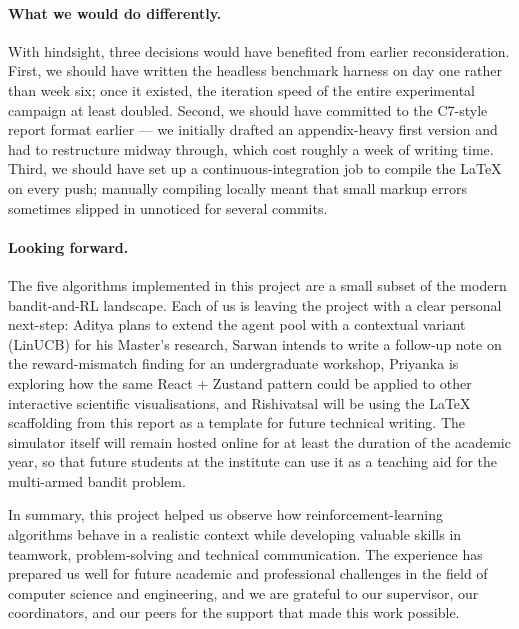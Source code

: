 \paragraph{What we would do differently.}
With hindsight, three decisions would have benefited from earlier reconsideration. First, we should have written the headless benchmark harness on day one rather than week six; once it existed, the iteration speed of the entire experimental campaign at least doubled. Second, we should have committed to the C7-style report format earlier --- we initially drafted an appendix-heavy first version and had to restructure midway through, which cost roughly a week of writing time. Third, we should have set up a continuous-integration job to compile the LaTeX on every push; manually compiling locally meant that small markup errors sometimes slipped in unnoticed for several commits.

\paragraph{Looking forward.}
The five algorithms implemented in this project are a small subset of the modern bandit-and-RL landscape. Each of us is leaving the project with a clear personal next-step: Aditya plans to extend the agent pool with a contextual variant (LinUCB) for his Master's research, Sarwan intends to write a follow-up note on the reward-mismatch finding for an undergraduate workshop, Priyanka is exploring how the same React + Zustand pattern could be applied to other interactive scientific visualisations, and Rishivatsal will be using the LaTeX scaffolding from this report as a template for future technical writing. The simulator itself will remain hosted online for at least the duration of the academic year, so that future students at the institute can use it as a teaching aid for the multi-armed bandit problem.

In summary, this project helped us observe how reinforcement-learning algorithms behave in a realistic context while developing valuable skills in teamwork, problem-solving and technical communication. The experience has prepared us well for future academic and professional challenges in the field of computer science and engineering, and we are grateful to our supervisor, our coordinators, and our peers for the support that made this work possible.
\newpage
